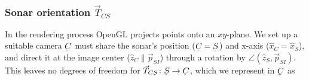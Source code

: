 %


\subsubsection{Sonar orientation \texorpdfstring{$\vec{T}_{CS}$}{T\_CS}}

%


In the rendering process OpenGL projects points onto an $xy$-plane. We set up a suitable camera $\ubar{C}$ must share the sonar's position ($\udot{C}=\udot{S}$) and x-axis ($\hat{x}_C=\hat{x}_S$), and direct it at the image center ($\hat{z}_C\parallel\vec{p}_{SI}$) through a rotation by $\angle(\hat{z}_S,\vec{p}_{SI})$. 
%
%
%
%
%
This leaves no degrees of freedom for $\vec{T}_{CS}\colon \udot{S}\to\udot{C}$, which we represent in $\ubar{C}$ as
%
%
%

